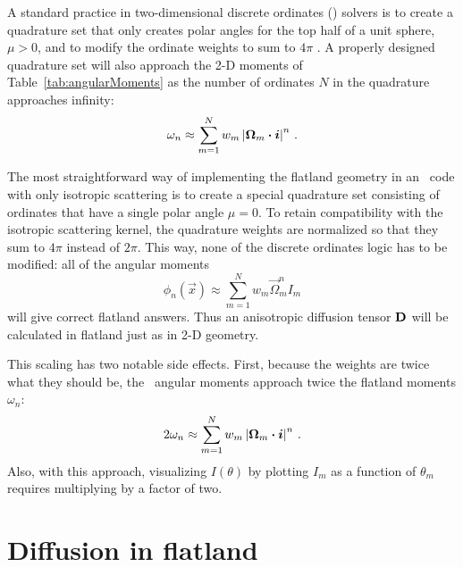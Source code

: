 A standard practice in two-dimensional discrete ordinates (\SN) solvers is to
create a quadrature set that only creates polar angles for the top half of a
unit sphere, $\mu>0$, and to modify the ordinate weights to sum to $4\pi$
\cite{Zik1997}. A properly designed quadrature set will also approach the 2-D
moments of Table~\ref{tab:angularMoments} as the number of ordinates
$N$ in the quadrature approaches infinity:
\begin{equation*}
  \omega_n \approx \sum_{m=1}^{N} w_m \left|  \bm{\Omega}_m \bm{\cdot} \bm{i} \right|^n \,.
\end{equation*}

The most straightforward way of implementing the flatland geometry in an \SN\
code with only isotropic scattering is to create a special quadrature set
consisting of ordinates that have a single
polar angle $\mu=0$. To retain compatibility with the isotropic scattering
kernel, the quadrature weights are normalized so that they sum to $4\pi$
instead of $2\pi$. This way, none of the discrete ordinates logic has to be
modified: all of the angular moments
\begin{equation*}
  \phi_n(\vec{x}) \approx \sum_{m=1}^{N} w_m \vec{\Omega}_m^n I_m
\end{equation*}
will give correct flatland answers. Thus an anisotropic diffusion tensor $\mathbf{D}$
will be calculated in flatland just as in 2-D geometry.

This scaling has two notable side effects. First, because the weights are twice
what they should be, the \SN\ angular moments approach twice the flatland
moments $\omega_n$:
\begin{equation*}
  2 \omega_n \approx \sum_{m=1}^{N} w_m \left|  \bm{\Omega}_m \bm{\cdot} \bm{i} \right|^n \,.
\end{equation*}
Also, with this approach, visualizing $I(\theta)$ by plotting
$I_m$ as a function of $\theta_m$ requires multiplying by a factor of two.

\section{Diffusion in flatland}

